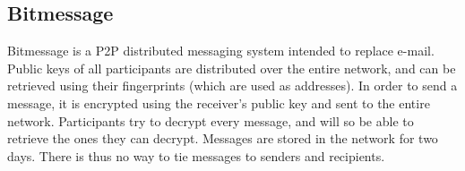 \subsection{Bitmessage}
Bitmessage\cite{Bitmessage:2014:Online} is a P2P distributed messaging system intended to replace e-mail. Public keys of all participants are distributed over the entire network, and can be retrieved using their fingerprints (which are used as addresses). In order to send a message, it is encrypted using the receiver's public key and sent to the entire network. Participants try to decrypt every message, and will so be able to retrieve the ones they can decrypt. Messages are stored in the network for two days. There is thus no way to tie messages to senders and recipients.
